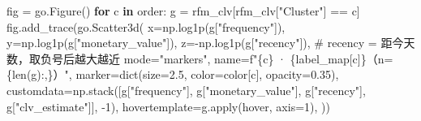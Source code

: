 \documentclass[
]{ctexart}
\newenvironment{Shaded}{\begin{snugshade}}{\end{snugshade}}
\newcommand{\BuiltInTok}[1]{\textcolor[rgb]{0.00,0.23,0.31}{#1}}
\newcommand{\CommentTok}[1]{\textcolor[rgb]{0.37,0.37,0.37}{#1}}
\newcommand{\ControlFlowTok}[1]{\textcolor[rgb]{0.00,0.23,0.31}{\textbf{#1}}}
\newcommand{\DecValTok}[1]{\textcolor[rgb]{0.68,0.00,0.00}{#1}}
\newcommand{\FloatTok}[1]{\textcolor[rgb]{0.68,0.00,0.00}{#1}}
\newcommand{\KeywordTok}[1]{\textcolor[rgb]{0.00,0.23,0.31}{\textbf{#1}}}
\newcommand{\NormalTok}[1]{\textcolor[rgb]{0.00,0.23,0.31}{#1}}
\newcommand{\OperatorTok}[1]{\textcolor[rgb]{0.37,0.37,0.37}{#1}}
\newcommand{\SpecialCharTok}[1]{\textcolor[rgb]{0.37,0.37,0.37}{#1}}
\newcommand{\SpecialStringTok}[1]{\textcolor[rgb]{0.13,0.47,0.30}{#1}}
\newcommand{\StringTok}[1]{\textcolor[rgb]{0.13,0.47,0.30}{#1}}
\begin{document}
\begin{Shaded}
\begin{Highlighting}[]
\NormalTok{fig }\OperatorTok{=}\NormalTok{ go.Figure()}
\ControlFlowTok{for}\NormalTok{ c }\KeywordTok{in}\NormalTok{ order:}
\NormalTok{    g }\OperatorTok{=}\NormalTok{ rfm\_clv[rfm\_clv[}\StringTok{"Cluster"}\NormalTok{] }\OperatorTok{==}\NormalTok{ c]}
\NormalTok{    fig.add\_trace(go.Scatter3d(}
\NormalTok{        x}\OperatorTok{=}\NormalTok{np.log1p(g[}\StringTok{"frequency"}\NormalTok{]),}
\NormalTok{        y}\OperatorTok{=}\NormalTok{np.log1p(g[}\StringTok{"monetary\_value"}\NormalTok{]),}
\NormalTok{        z}\OperatorTok{={-}}\NormalTok{np.log1p(g[}\StringTok{"recency"}\NormalTok{]),          }\CommentTok{\# recency = 距今天数，取负号后越大越近}
\NormalTok{        mode}\OperatorTok{=}\StringTok{"markers"}\NormalTok{,}
\NormalTok{        name}\OperatorTok{=}\SpecialStringTok{f"}\SpecialCharTok{\{}\NormalTok{c}\SpecialCharTok{\}}\SpecialStringTok{ · }\SpecialCharTok{\{}\NormalTok{label\_map[c]}\SpecialCharTok{\}}\SpecialStringTok{（n=}\SpecialCharTok{\{}\BuiltInTok{len}\NormalTok{(g)}\SpecialCharTok{:,\}}\SpecialStringTok{）"}\NormalTok{,}
\NormalTok{        marker}\OperatorTok{=}\BuiltInTok{dict}\NormalTok{(size}\OperatorTok{=}\FloatTok{2.5}\NormalTok{, color}\OperatorTok{=}\NormalTok{color[c], opacity}\OperatorTok{=}\FloatTok{0.35}\NormalTok{),}
\NormalTok{        customdata}\OperatorTok{=}\NormalTok{np.stack([g[}\StringTok{"frequency"}\NormalTok{], g[}\StringTok{"monetary\_value"}\NormalTok{],}
\NormalTok{                             g[}\StringTok{"recency"}\NormalTok{], g[}\StringTok{"clv\_estimate"}\NormalTok{]], }\OperatorTok{{-}}\DecValTok{1}\NormalTok{),}
\NormalTok{        hovertemplate}\OperatorTok{=}\NormalTok{g.}\BuiltInTok{apply}\NormalTok{(hover, axis}\OperatorTok{=}\DecValTok{1}\NormalTok{), }
\NormalTok{    ))}


\end{Highlighting}
\end{Shaded}
\end{document}
